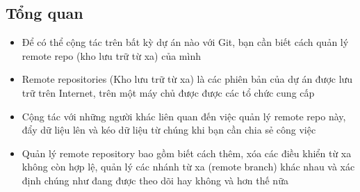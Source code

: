 \documentclass[12pt,a4paper]{report}
\begin{document}
\subsection{Tổng quan} 
\begin{itemize}
\item Để có thể cộng tác trên bất kỳ dự án nào với Git, bạn cần biết cách quản lý remote repo (kho lưu trữ từ xa) của mình
\item Remote repositories (Kho lưu trữ từ xa) là các phiên bản của dự án được lưu trữ trên Internet,  trên một máy chủ được được các tổ chức cung cấp
\item Cộng tác với những người khác liên quan đến việc quản lý remote repo này, đẩy dữ liệu lên và kéo dữ liệu  từ chúng khi bạn cần chia sẻ công việc
\item Quản lý remote repository bao gồm biết cách thêm, xóa các điều khiển từ xa không còn hợp lệ, quản lý các nhánh từ xa (remote branch) khác nhau và xác định chúng như đang được theo dõi hay không và hơn thế nữa
\end{itemize}
\end{document}
